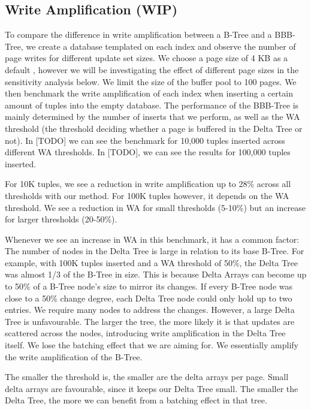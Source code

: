 \subsection*{Write Amplification (WIP)}

To compare the difference in write amplification between a B-Tree and a BBB-Tree, we create a database templated on each index and observe the number of page writes for different update set sizes.
We choose a page size of 4 KB as a default \cite{haas2023modern}, however we will be investigating the effect of different page sizes in the sensitivity analysis below.
We limit the size of the buffer pool to 100 pages.
We then benchmark the write amplification of each index when inserting a certain amount of tuples into the empty database.
The performance of the BBB-Tree is mainly determined by the number of inserts that we perform, as well as the \ac{WA} threshold (the threshold deciding whether a page is buffered in the Delta Tree or not).
In [TODO] we can see the benchmark for 10,000 tuples inserted across different \ac{WA} thresholds.
In [TODO], we can see the results for 100,000 tuples inserted.

For 10K tuples, we see a reduction in write amplification up to 28\% across all thresholds with our method.
For 100K tuples however, it depends on the \ac{WA} threshold.
We see a reduction in \ac{WA} for small thresholds (5-10\%) but an increase for larger thresholds (20-50\%).

Whenever we see an increase in \ac{WA} in this benchmark, it has a common factor: 
The number of nodes in the Delta Tree is large in relation to its base B-Tree.
For example, with 100K tuples inserted and a \ac{WA} threshold of 50\%, the Delta Tree was almost 1/3 of the B-Tree in size.
This is because Delta Arrays can become up to 50\% of a B-Tree node's size to mirror its changes.
If every B-Tree node was close to a 50\% change degree, each Delta Tree node could only hold up to two entries.
We require many nodes to address the changes.
However, a large Delta Tree is unfavourable. 
The larger the tree, the more likely it is that updates are scattered across the nodes, introducing write amplification in the Delta Tree itself.
We lose the batching effect that we are aiming for.
We essentially amplify the write amplification of the B-Tree. 

The smaller the threshold is, the smaller are the delta arrays per page.
Small delta arrays are favourable, since it keeps our Delta Tree small. 
The smaller the Delta Tree, the more we can benefit from a batching effect in that tree.

